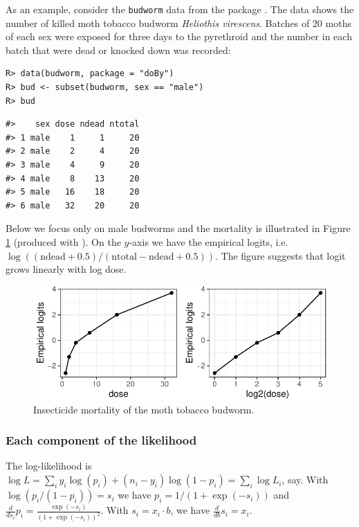 As an example, consider the \texttt{budworm} data from the  package 
\citep{doBy}.
The data shows the number of killed moth tobacco budworm
\emph{Heliothis virescens}. Batches of 20 moths of each sex were
exposed for three days to the pyrethroid and the number in each batch
that were dead or knocked down was recorded:

\begin{verbatim}
R> data(budworm, package = "doBy")
R> bud <- subset(budworm, sex == "male")
R> bud
\end{verbatim}

\begin{verbatim}
#>    sex dose ndead ntotal
#> 1 male    1     1     20
#> 2 male    2     4     20
#> 3 male    4     9     20
#> 4 male    8    13     20
#> 5 male   16    18     20
#> 6 male   32    20     20
\end{verbatim}

Below we focus only on male budworms and the mortality is illustrated
in Figure \ref{fig:budworm} (produced with  \citep{ggplot2}). On the \(y\)-axis we have the empirical
logits, i.e.~\(\log((\text{ndead} + 0.5)/(\text{ntotal}-\text{ndead} + 0.5))\). The figure suggests that logit grows linearly with log dose.

\begin{figure}
\centering
\includegraphics{budworm-1.pdf}
\caption{\label{fig:budworm}Insecticide mortality of the moth tobacco budworm.}
\end{figure}

\hypertarget{each-component-of-the-likelihood}{%
\subsubsection{Each component of the likelihood}\label{each-component-of-the-likelihood}}

The log-likelihood is \(\log L=\sum_i y_i \log(p_i) + (n_i-y_i) \log(1-p_i) = \sum_i \log L_i\), say. With \(\log(p_i/(1-p_i)) = s_i\) we
have \(p_i=1 / (1+ \exp(-s_i))\) and \(\frac d {ds_i} p_i = \frac{\exp(- s_i)}{\left(1 + \exp(- s_i)\right)^{2}}\). With \(s_i = x_i\cdot b\), we
have \(\frac d {db} s_i = x_i\).


